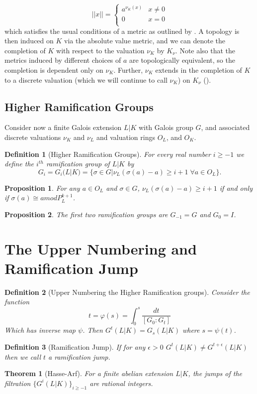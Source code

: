 \documentclass[paper=a4, fontsize=11pt]{scrartcl} %
\numberwithin{equation}{section} %
\numberwithin{figure}{section} %
\numberwithin{table}{section} %
\theoremstyle{break}
\newtheorem{defn}{Definition}
\newtheorem{thm}{Theorem}
\newtheorem{prop}{Proposition}
\begin{document}
\[ ||x|| =  \begin{cases} 
      a^{\nu_K(x)} & x \not= 0 \\
      0 & x = 0 \\
   \end{cases}
\]
which satisfies the usual conditions of a metric as outlined by \cite{Serre}. A topology is then induced on $K$ via the absolute value metric, and we can denote the completion of $K$ with respect to the valuation $\nu_K$ by $K_\nu$. Note also that the metrics induced by different choices of $a$ are topologically equivalent, so the completion is dependent only on $\nu_K$. Further, $\nu_K$ extends in the completion of $K$ to a discrete valuation (which we will continue to call $\nu_K$) on $K_\nu$ (\cite{Serre}).

\subsection{Higher Ramification Groups}
Consider now a finite Galois extension $L|K$ with Galois group $G$, and associated discrete valuations $\nu_K$ and $\nu_L$ and valuation rings $O_L$, and $O_K$.
\begin{defn}[Higher Ramification Groups]
For every real number $i \geq -1$ we define the $i^{th}$ ramification group of $L|K$ by
$$
G_i = G_i(L|K) = \{\sigma \in G | \nu_L(\sigma(a)-a)\geq i+1\;\forall a \in O_L\}.
$$
\end{defn}

\begin{prop}
For any $a \in O_L$ and $\sigma \in G$, $\nu_L(\sigma(a) - a) \geq i+1$ if and only if  $\sigma(a) \cong a mod P_L^{k+1}$.
\end{prop}

\begin{prop}
The first two ramification groups are $G_{-1} = G$ and $G_{0}=I$.
\end{prop}

\section{The Upper Numbering and Ramification Jump}

\begin{defn}[Upper Numbering the Higher Ramification groups]
Consider the function
$$
t = \varphi(s) = \int_{0}^{s} \frac{dt}{[G_0 : G_t]}
$$
Which has inverse map $\psi$.
Then $G^t(L|K) = G_s(L|K)$ where $s=\psi(t)$. 
\end{defn}
\begin{defn}[Ramification Jump]
If for any $\epsilon >0$ $G^{t}(L|K) \not=G^{t+\epsilon}(L|K)$ then we call $t$ a ramification jump.
\end{defn}
\begin{thm}[Hasse-Arf]
For a finite abelian extension $L|K$, the jumps of the filtration $\{G^{i}(L|K)\}_{i \geq -1}$ are rational integers.
\end{thm}

\nocite{*}
\printbibliography
\end{document}
